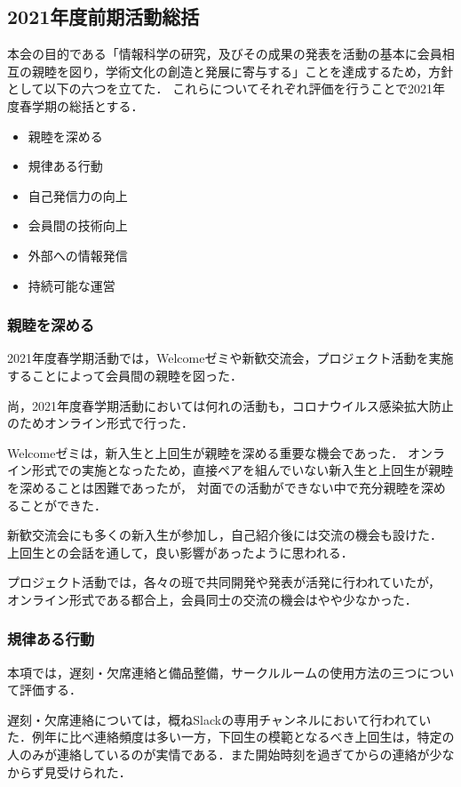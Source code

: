 \subsection*{2021年度前期活動総括}


本会の目的である「情報科学の研究，及びその成果の発表を活動の基本に会員相互の親睦を図り，学術文化の創造と発展に寄与する」ことを達成するため，方針として以下の六つを立てた．
これらについてそれぞれ評価を行うことで2021年度春学期の総括とする．

\begin{itemize}
    \item 親睦を深める
    \item 規律ある行動
    \item 自己発信力の向上
    \item 会員間の技術向上
    \item 外部への情報発信
    \item 持続可能な運営
\end{itemize}

\subsubsection*{親睦を深める}
    2021年度春学期活動では，Welcomeゼミや新歓交流会，プロジェクト活動を実施することによって会員間の親睦を図った．

    尚，2021年度春学期活動においては何れの活動も，コロナウイルス感染拡大防止のためオンライン形式で行った．

    Welcomeゼミは，新入生と上回生が親睦を深める重要な機会であった．
    オンライン形式での実施となったため，直接ペアを組んでいない新入生と上回生が親睦を深めることは困難であったが，
    対面での活動ができない中で充分親睦を深めることができた．

    新歓交流会にも多くの新入生が参加し，自己紹介後には交流の機会も設けた．
    上回生との会話を通して，良い影響があったように思われる．

    プロジェクト活動では，各々の班で共同開発や発表が活発に行われていたが，
    オンライン形式である都合上，会員同士の交流の機会はやや少なかった．

\subsubsection*{規律ある行動}
    本項では，遅刻・欠席連絡と備品整備，サークルルームの使用方法の三つについて評価する．

    遅刻・欠席連絡については，概ねSlackの専用チャンネルにおいて行われていた．例年に比べ連絡頻度は多い一方，下回生の模範となるべき上回生は，特定の人のみが連絡しているのが実情である．また開始時刻を過ぎてからの連絡が少なからず見受けられた．

